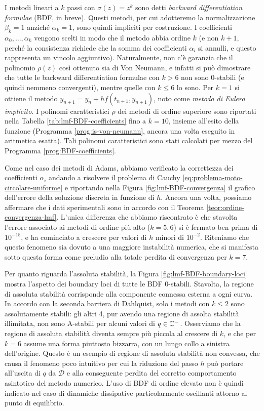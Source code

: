 I metodi lineari a $k$ passi con $\sigma(z) = z^k$ sono detti
\emph{backward differentiation formulae} (BDF, in breve).
Questi metodi, per cui adotteremo la normalizzazione $\beta_k = 1$
anziché $\alpha_k = 1$, sono quindi impliciti per costruzione.
I coefficienti $\alpha_0,\dots,\alpha_k$ vengono scelti in modo che
il metodo abbia ordine $k$ (e non $k+1$, perché la consistenza
richiede che la somma dei coefficienti $\alpha_i$ si annulli,
e questo rappresenta un vincolo aggiuntivo). Naturalmente, non c'è garanzia
che il polinomio $\rho(z)$ così ottenuto sia di Von Neumann, e infatti
si può dimostrare che tutte le backward differentiation formulae con $k > 6$
non sono 0-stabili (e quindi nemmeno convergenti), mentre quelle con
$k \leq 6$ lo sono.
Per $k=1$ si ottiene il metodo $y_{n+1} = y_n + h f(t_{n+1},y_{n+1})$,
noto come \emph{metodo di Eulero implicito}. I polinomi caratteristici
$\rho$ dei metodi di ordine superiore sono riportati nella Tabella
\ref{tab:lmf-BDF-coefficients} fino a $k=10$, insieme all'esito
della funzione  (Programma \ref{prog:is-von-neumann},
ancora una volta eseguito in aritmetica esatta).
Tali polinomi caratteristici sono stati calcolati per mezzo del
Programma \ref{prog:BDF-coefficients}.

Come nel caso dei metodi di Adams, abbiamo verificato la correttezza
dei coefficienti $\alpha_i$ andando a risolvere il problema di Cauchy
\eqref{eq:problema-moto-circolare-uniforme} e riportando nella Figura
\ref{fig:lmf-BDF-convergenza} il grafico dell'errore della soluzione
discreta in funzione di $h$. Ancora una volta, possiamo affermare che i
dati sperimentali sono in accordo con il Teorema \ref{teor:ordine-convergenza-lmf}.
L'unica differenza che abbiamo riscontrato è che stavolta l'errore associato
ai metodi di ordine più alto ($k = 5,6$) si è fermato ben prima di $10^{-15}$,
e ha cominciato a crescere per valori di $h$ minori di $10^{-2}$.
Riteniamo che questo fenomeno sia dovuto a una maggiore instabilità numerica,
che si manifesta sotto questa forma come preludio alla totale perdita di
convergenza per $k = 7$.

Per quanto riguarda l'assoluta stabilità, la Figura \ref{fig:lmf-BDF-boundary-loci}
mostra l'aspetto dei boundary loci di tutte le BDF 0-stabili.
Stavolta, la regione di assoluta stabilità corrisponde alla componente
connessa esterna a ogni curva.
In accordo con la seconda barriera di Dahlquist, solo i metodi con $k \leq 2$
sono assolutamente stabili: gli altri 4, pur avendo una regione di assolta
stabilità illimitata, non sono A-stabili per alcuni valori di $q \in \mathbb{C}^-$.
Osserviamo che la regione di assoluta stabilità diventa sempre più
piccola al crescere di $k$, e che per $k=6$ assume una forma piuttosto bizzarra,
con un lungo collo a sinistra dell'origine.
Questo è un esempio di regione di assoluta stabilità non convessa,
che causa il fenomeno poco intuitivo per cui la riduzione del passo $h$
può portare all'uscita di $q$ da $\mathcal{D}$ e alla conseguente
perdita del corretto comportamento asintotico del metodo numerico.
L'uso di BDF di ordine elevato non è quindi indicato nel caso di
dinamiche dissipative particolarmente oscillanti attorno al punto
di equilibrio.

